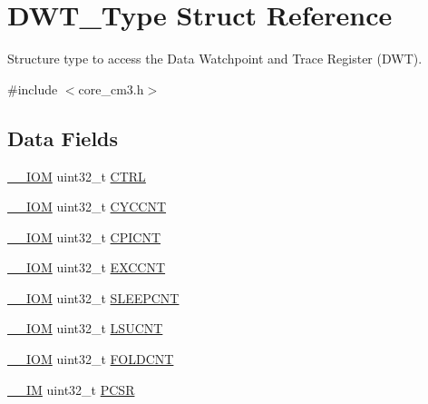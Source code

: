 \hypertarget{struct_d_w_t___type}{}\section{D\+W\+T\+\_\+\+Type Struct Reference}
\label{struct_d_w_t___type}


Structure type to access the Data Watchpoint and Trace Register (D\+WT).  




{\ttfamily \#include $<$core\+\_\+cm3.\+h$>$}

\subsection*{Data Fields}
\begin{DoxyCompactItemize}
\item 
\hyperlink{core__sc300_8h_ab6caba5853a60a17e8e04499b52bf691}{\+\_\+\+\_\+\+I\+OM} uint32\+\_\+t \hyperlink{struct_d_w_t___type_ac81efc171e9852a36caeb47122bfec5b}{C\+T\+RL}
\item 
\hyperlink{core__sc300_8h_ab6caba5853a60a17e8e04499b52bf691}{\+\_\+\+\_\+\+I\+OM} uint32\+\_\+t \hyperlink{struct_d_w_t___type_a14822f5ad3426799332ac537d9293f3c}{C\+Y\+C\+C\+NT}
\item 
\hyperlink{core__sc300_8h_ab6caba5853a60a17e8e04499b52bf691}{\+\_\+\+\_\+\+I\+OM} uint32\+\_\+t \hyperlink{struct_d_w_t___type_a29ca657c77928334be08a2e6555be950}{C\+P\+I\+C\+NT}
\item 
\hyperlink{core__sc300_8h_ab6caba5853a60a17e8e04499b52bf691}{\+\_\+\+\_\+\+I\+OM} uint32\+\_\+t \hyperlink{struct_d_w_t___type_afe0bbc124e53ad450abc72bfb56bd74f}{E\+X\+C\+C\+NT}
\item 
\hyperlink{core__sc300_8h_ab6caba5853a60a17e8e04499b52bf691}{\+\_\+\+\_\+\+I\+OM} uint32\+\_\+t \hyperlink{struct_d_w_t___type_aafa1400cd3168b21652b86599ad3ed83}{S\+L\+E\+E\+P\+C\+NT}
\item 
\hyperlink{core__sc300_8h_ab6caba5853a60a17e8e04499b52bf691}{\+\_\+\+\_\+\+I\+OM} uint32\+\_\+t \hyperlink{struct_d_w_t___type_ae886261750c8c90d67a2f276d074e9c3}{L\+S\+U\+C\+NT}
\item 
\hyperlink{core__sc300_8h_ab6caba5853a60a17e8e04499b52bf691}{\+\_\+\+\_\+\+I\+OM} uint32\+\_\+t \hyperlink{struct_d_w_t___type_a6324c1fbf6c94f1eaf742d09ad678216}{F\+O\+L\+D\+C\+NT}
\item 
\hyperlink{core__sc300_8h_a4cc1649793116d7c2d8afce7a4ffce43}{\+\_\+\+\_\+\+IM} uint32\+\_\+t \hyperlink{struct_d_w_t___type_a72e52fffe9ac6af0ee15877e2d5dac41}{P\+C\+SR}

\end{DoxyCompactItemize}
